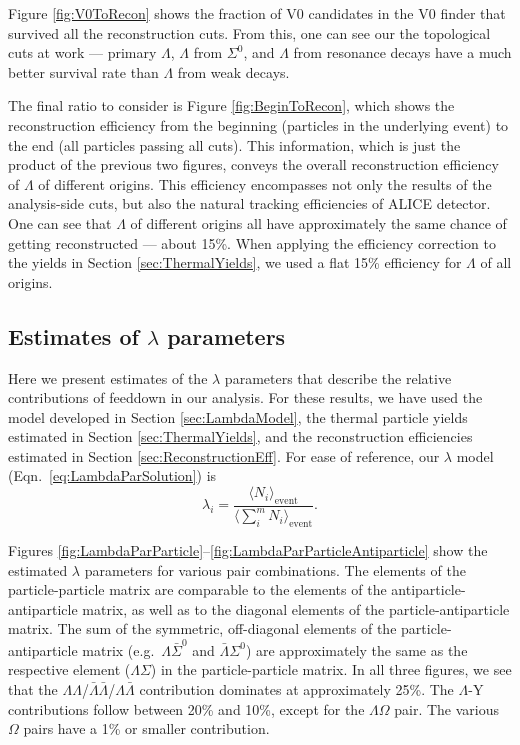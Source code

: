 Figure \ref{fig:V0ToRecon} shows the fraction of V0 candidates in the V0 finder that survived all the reconstruction cuts.  
From this, one can see our the topological cuts at work --- primary $\Lambda$, $\Lambda$ from $\Sigma^0$, and $\Lambda$ from resonance decays have a much better survival rate than $\Lambda$ from weak decays.

The final ratio to consider is Figure \ref{fig:BeginToRecon}, which shows the reconstruction efficiency from the beginning (particles in the underlying event) to the end (all particles passing all cuts).
This information, which is just the product of the previous two figures, conveys the overall reconstruction efficiency of $\Lambda$ of different origins.
This efficiency encompasses not only the results of the analysis-side cuts, but also the natural tracking efficiencies of ALICE detector.  
One can see that $\Lambda$ of different origins all have approximately the same chance of getting reconstructed --- about 15\%.
When applying the efficiency correction to the yields in Section \ref{sec:ThermalYields}, we used a flat 15\% efficiency for $\Lambda$ of all origins.

\subsection{Estimates of \texorpdfstring{$\lambda$}{lambda} parameters}
\label{sec:LambdaParamEstimates}

Here we present estimates of the $\lambda$ parameters that describe the relative contributions of feeddown in our analysis.
For these results, we have used the model developed in Section \ref{sec:LambdaModel}, the thermal particle yields estimated in Section \ref{sec:ThermalYields}, and the reconstruction efficiencies estimated in Section \ref{sec:ReconstructionEff}.
For ease of reference, our $\lambda$ model (Eqn.\ \ref{eq:LambdaParSolution}) is
$$\lambda_i = \frac{\langle N_{i}\rangle_{\mathrm{event}}} {\langle\sum_i^m N_{i}\rangle_{\mathrm{event}}}.$$

Figures \ref{fig:LambdaParParticle}--\ref{fig:LambdaParParticleAntiparticle} show the estimated $\lambda$ parameters for various pair combinations. 
The elements of the particle-particle matrix are comparable to the elements of the antiparticle-antiparticle matrix, as well as to the diagonal elements of the particle-antiparticle matrix.
The sum of the symmetric, off-diagonal elements of the particle-antiparticle matrix (e.g.\ $\Lambda\bar{\Sigma}^0$ and $\bar{\Lambda}\Sigma^0$) are approximately the same as the respective element ($\Lambda\Sigma$) in the particle-particle matrix.
In all three figures, we see that the $\Lambda\Lambda$/$\bar{\Lambda}\bar{\Lambda}$/$\Lambda\bar{\Lambda}$ contribution dominates at approximately 25\%. The $\Lambda$-Y contributions follow between 20\% and 10\%, except for the $\Lambda\Omega$ pair. The various $\Omega$ pairs have a 1\% or smaller contribution. 

